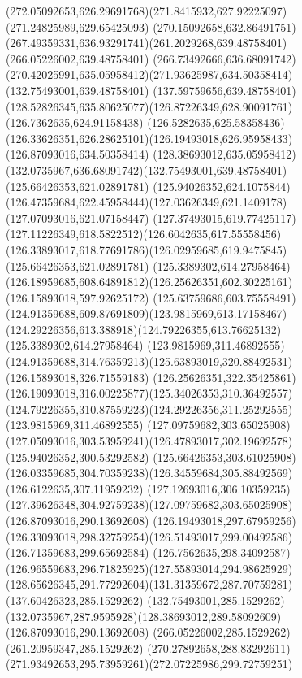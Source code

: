 {{		\curveto(272.05092653,626.29691768)(271.8415932,627.92225097)(271.24825989,629.65425093)
		\curveto(270.15092658,632.86491751)(267.49359331,636.93291741)(261.2029268,639.48758401)
		\lineto(266.05226002,639.48758401)
		\curveto(266.73492666,636.68091742)(270.42025991,635.05958412)(271.93625987,634.50358414)
		\moveto(132.75493001,639.48758401)
		\lineto(137.59759656,639.48758401)
		\curveto(128.52826345,635.80625077)(126.87226349,628.90091761)(126.7362635,624.91158438)
		\curveto(126.5282635,625.58358436)(126.33626351,626.28625101)(126.19493018,626.95958433)
		\lineto(126.87093016,634.50358414)
		\curveto(128.38693012,635.05958412)(132.0735967,636.68091742)(132.75493001,639.48758401)
		\moveto(125.66426353,621.02891781)
		\lineto(125.94026352,624.1075844)
		\curveto(126.47359684,622.45958444)(127.03626349,621.1409178)(127.07093016,621.07158447)
		\curveto(127.37493015,619.77425117)(127.11226349,618.5822512)(126.6042635,617.55558456)
		\curveto(126.33893017,618.77691786)(126.02959685,619.9475845)(125.66426353,621.02891781)
		\moveto(125.3389302,614.27958464)
		\curveto(126.18959685,608.64891812)(126.25626351,602.30225161)(126.15893018,597.92625172)
		\curveto(125.63759686,603.75558491)(124.91359688,609.87691809)(123.9815969,613.17158467)
		\curveto(124.29226356,613.388918)(124.79226355,613.76625132)(125.3389302,614.27958464)
		\moveto(123.9815969,311.46892555)
		\curveto(124.91359688,314.76359213)(125.63893019,320.88492531)(126.15893018,326.71559183)
		\curveto(126.25626351,322.35425861)(126.19093018,316.00225877)(125.34026353,310.36492557)
		\curveto(124.79226355,310.87559223)(124.29226356,311.25292555)(123.9815969,311.46892555)
		\moveto(127.09759682,303.65025908)
		\curveto(127.05093016,303.53959241)(126.47893017,302.19692578)(125.94026352,300.53292582)
		\lineto(125.66426353,303.61025908)
		\curveto(126.03359685,304.70359238)(126.34559684,305.88492569)(126.6122635,307.11959232)
		\curveto(127.12693016,306.10359235)(127.39626348,304.92759238)(127.09759682,303.65025908)
		\moveto(126.87093016,290.13692608)
		\lineto(126.19493018,297.67959256)
		\curveto(126.33093018,298.32759254)(126.51493017,299.00492586)(126.71359683,299.65692584)
		\curveto(126.7562635,298.34092587)(126.96559683,296.71825925)(127.55893014,294.98625929)
		\curveto(128.65626345,291.77292604)(131.31359672,287.70759281)(137.60426323,285.1529262)
		\lineto(132.75493001,285.1529262)
		\curveto(132.0735967,287.9595928)(128.38693012,289.58092609)(126.87093016,290.13692608)
		\moveto(266.05226002,285.1529262)
		\lineto(261.20959347,285.1529262)
		\curveto(270.27892658,288.83292611)(271.93492653,295.73959261)(272.07225986,299.72759251)
}}
